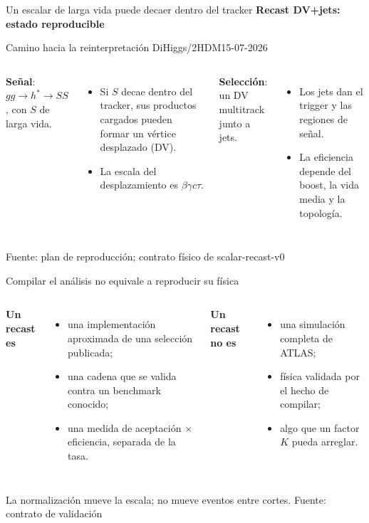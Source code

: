 \documentclass[aspectratio=169,10pt]{beamer}
\newcommand{\source}[1]{\vfill{\tiny\color{gray}Fuente: #1}}
\begin{document}
\begin{frame}{Un escalar de larga vida puede decaer dentro del tracker}
  {\Large\textbf{Recast DV+jets: estado reproducible}}\par\vspace{0.25em}
  {\large Camino hacia la reinterpretación DiHiggs/2HDM\hfill\normalsize 15-07-2026}\par
  \vspace{0.9em}
  \begin{columns}[T]
    \textbf{Señal}: $gg\to h^*\to SS$, con $S$ de larga vida.
    \begin{itemize}
      \item Si $S$ decae dentro del tracker, sus productos cargados
            pueden formar un vértice desplazado (DV).
      \item La escala del desplazamiento es $\beta\gamma c\tau$.
    \end{itemize}
    \textbf{Selección}: un DV multitrack junto a jets.
    \begin{itemize}
      \item Los jets dan el trigger y las regiones de señal.
      \item La eficiencia depende del boost, la vida media y la topología.
    \end{itemize}
  \end{columns}
  \source{plan de reproducción; contrato físico de scalar-recast-v0}
\end{frame}

\begin{frame}{Compilar el análisis no equivale a reproducir su física}
  \begin{columns}[T]
    \textbf{Un recast es}
    \begin{itemize}
      \item una implementación aproximada de una selección publicada;
      \item una cadena que se valida contra un benchmark conocido;
      \item una medida de aceptación $\times$ eficiencia, separada de la tasa.
    \end{itemize}
    \textbf{Un recast no es}
    \begin{itemize}
      \item una simulación completa de ATLAS;
      \item física validada por el hecho de compilar;
      \item algo que un factor $K$ pueda arreglar.
    \end{itemize}
  \end{columns}
  \vspace{0.9em}
  \centering
  La normalización mueve la escala; no mueve eventos entre cortes.
  \source{contrato de validación}
\end{frame}
\end{document}
